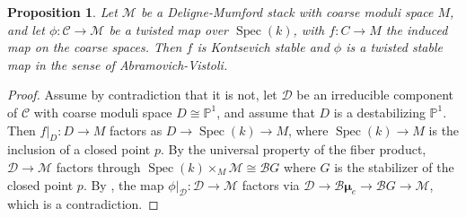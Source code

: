 \documentclass{amsart}
\newcommand{\bP}{\mathbb{P}}
\newcommand{\cB}{\mathcal{B}}
\newcommand{\cC}{\mathcal{C}}
\newcommand{\cD}{\mathcal{D}}
\newcommand{\cM}{\mathcal{M}}
\newcommand{\spec}{\operatorname{Spec}}
\newcommand{\bmu}{\bm{\mu}}
\newtheorem{Prop}[theorem]{Proposition}
\theoremstyle{definition}
\begin{document}
\begin{Prop}
Let $\cM$ be a Deligne-Mumford stack with coarse moduli space $M$, and let $\phi:\cC\to \cM$ be a twisted map over $\spec(k)$, with $f:C\to M$ the induced map on the coarse spaces. Then $f$ is Kontsevich stable and $\phi$ is a twisted stable map in the sense of Abramovich-Vistoli.
\end{Prop}
\begin{proof}Assume by contradiction that it is not, let $\cD$ be an irreducible component of $\cC$ with coarse moduli space $D\cong \bP^1$, and assume that $D$ is a destabilizing $\bP^1$.  Then $f|_D:D\to M$ factors as $D\to \spec(k)\to M$, where $\spec(k)\to M$ is the inclusion of a closed point $p$.  By the universal property of the fiber product, $\cD\to \cM$ factors through $\spec(k)\times_M\cM \cong \cB G$ where $G$ is the stabilizer of the closed point $p$.  By ,  the map $\phi|_\cD:\cD\to \cM$ factors via $\cD\to \cB\bmu_e\to \cB G\to \cM$, which is a contradiction.
\end{proof}
\end{document}
